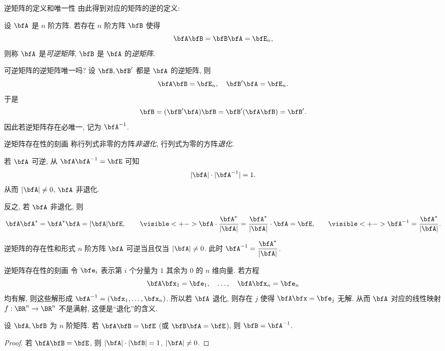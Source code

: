 \begin{frame}{逆矩阵的定义和唯一性}
	\onslide<+->
	由此得到对应的矩阵的逆的定义:
	\onslide<+->
	\begin{definition}
		设 $\bfA$ 是 $n$ 阶方阵. 若存在 $n$ 阶方阵 $\bfB$ 使得
		\[\bfA\bfB=\bfB\bfA=\bfE_n,\]
		则称 $\bfA$ 是\emph{可逆矩阵}, $\bfB$ 是 $\bfA$ 的\emph{逆矩阵}.
	\end{definition}
	\onslide<+->
	可逆矩阵的逆矩阵唯一吗?
	\onslide<+->
	设 $\bfB,\bfB'$ 都是 $\bfA$ 的逆矩阵, 则
	\[\bfA\bfB=\bfE_n,\quad \bfB'\bfA=\bfE_n.\]
	\onslide<+->
	于是
	\[\bfB=(\bfB'\bfA)\bfB=\bfB'(\bfA\bfB)=\bfB'.\]
	\onslide<+->
	因此\alert{若逆矩阵存在必唯一, 记为 $\bfA^{-1}$}.
\end{frame}


\begin{frame}{逆矩阵存在性的刻画}
	\onslide<+->
	称行列式非零的方阵\emph{非退化}, 行列式为零的方阵\emph{退化}.

	\onslide<+->
	若 $\bfA$ 可逆, 从 $\bfA\bfA^{-1}=\bfE$ 可知
	\[|\bfA|\cdot|\bfA^{-1}|=1.\]
	\onslide<+->
	从而 $|\bfA|\neq 0$, $\bfA$ 非退化.

	\onslide<+->
	反之, 若 $\bfA$ 非退化, 则
	\[\bfA\bfA^*=\bfA^*\bfA=|\bfA|\bfE,\qquad
	\visible<+->{\bfA\cdot\frac{\bfA^*}{|\bfA|}=\frac{\bfA^*}{|\bfA|}\cdot\bfA=\bfE,}\qquad
	\visible<+->{\bfA^{-1}=\frac{\bfA^*}{|\bfA|}.}\]
	\onslide<+->
	\begin{second}{逆矩阵的存在性和形式}
		$n$ 阶方阵 $\bfA$ 可逆当且仅当 $|\bfA|\neq 0$.
		此时 $\bfA^{-1}=\dfrac{\bfA^*}{|\bfA|}$.
	\end{second}
\end{frame}


\begin{frame}{逆矩阵存在性的刻画}
	\onslide<+->
	令 $\bfe_i$ 表示第 $i$ 个分量为 $1$ 其余为 $0$ 的 $n$ 维向量.
	\onslide<+->
	若方程
	\[\bfA\bfx_1=\bfe_1,\quad\dots,\quad\bfA\bfx_n=\bfe_n\]
	均有解, 则这些解形成 $\bfA^{-1}=(\bfx_1,\dots,\bfx_n)$.
	\onslide<+->
	所以若 $\bfA$ 退化, 则存在 $j$ 使得 $\bfA\bfx=\bfe_j$ 无解.
	\onslide<+->
	从而 $\bfA$ 对应的线性映射 $f:\BR^n\to\BR^n$ 不是满射, 这便是``退化''的含义.

	\onslide<+->
	\begin{corollary}
		设 $\bfA,\bfB$ 为 $n$ 阶矩阵.
		若 $\bfA\bfB=\bfE$ (或 $\bfB\bfA=\bfE$), 则 $\bfB=\bfA^{-1}$.
	\end{corollary}
	\onslide<+->
	\begin{proof}
		若 $\bfA\bfB=\bfE$, 则 $|\bfA|\cdot|\bfB|=1$, $|\bfA|\neq0$.
		\onslide<+->{%
			\[\bfA^{-1}=\bfA^{-1}(\bfA\bfB)=\bfB.\qedhere\]
		}\vspace{-\baselineskip}
	\end{proof}
\end{frame}


